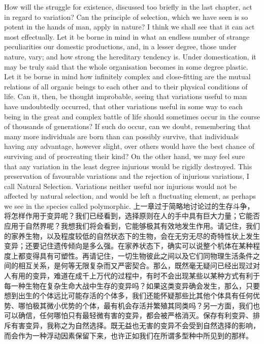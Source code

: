 \darwinpair
{How will the struggle for existence, discussed too briefly in the last chapter, act in regard to variation? Can the principle of selection, which we have seen is so potent in the hands of man, apply in nature? I think we shall see that it can act most effectually. Let it be borne in mind in what an endless number of strange peculiarities our domestic productions, and, in a lesser degree, those under nature, vary; and how strong the hereditary tendency is. Under domestication, it may be truly said that the whole organisation becomes in some degree plastic. Let it be borne in mind how infinitely complex and close-fitting are the mutual relations of all organic beings to each other and to their physical conditions of life. Can it, then, be thought improbable, seeing that variations useful to man have undoubtedly occurred, that other variations useful in some way to each being in the great and complex battle of life should sometimes occur in the course of thousands of generations? If such do occur, can we doubt, remembering that many more individuals are born than can possibly survive, that individuals having any advantage, however slight, over others would have the best chance of surviving and of procreating their kind? On the other hand, we may feel sure that any variation in the least degree injurious would be rigidly destroyed. This preservation of favourable variations and the rejection of injurious variations, I call Natural Selection. Variations neither useful nor injurious would not be affected by natural selection, and would be left a fluctuating element, as perhaps we see in the species called polymorphic.}
{上一章过于简略地讨论过的生存斗争，将怎样作用于变异呢？我们已经看到，选择原则在人的手中具有巨大力量；它能否应用于自然界呢？我想我们将会看到，它能够极其有效地发生作用。请记住，我们的家养生物，以及程度较低的自然状态下的生物，会在无穷无尽的奇特性状上发生变异；还要记住遗传倾向是多么强。在家养状态下，确实可以说整个机体在某种程度上都变得具有可塑性。再请记住，一切生物彼此之间以及它们同物理生活条件之间的相互关系，是何等无限复杂而又严密契合。那么，既然毫无疑问已经出现过对人有用的变异，难道在成千上万代的过程中，有时不会出现某些以某种方式有利于每一种生物在复杂生命大战中生存的变异吗？如果这类变异确会发生，那么，只要想到出生的个体远比可能存活的个体多，我们还能怀疑那些比其他个体具有任何优势、哪怕极其微小优势的个体，最有机会存活并繁殖其同类吗？另一方面，我们也可以确信，任何哪怕只有最轻微有害的变异，都会被严格消灭。保存有利变异、排斥有害变异，我称之为自然选择。既无益也无害的变异不会受到自然选择的影响，而会作为一种浮动因素保留下来，也许正如我们在所谓多型种中所见到的那样。}

